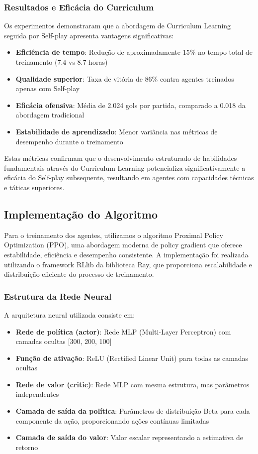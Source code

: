 \subsubsection{Resultados e Eficácia do Curriculum}

Os experimentos demonstraram que a abordagem de Curriculum Learning seguida por Self-play apresenta vantagens significativas:

\begin{itemize}
    \item \textbf{Eficiência de tempo}: Redução de aproximadamente 15\% no tempo total de treinamento (7.4 vs 8.7 horas)
    \item \textbf{Qualidade superior}: Taxa de vitória de 86\% contra agentes treinados apenas com Self-play
    \item \textbf{Eficácia ofensiva}: Média de 2.024 gols por partida, comparado a 0.018 da abordagem tradicional
    \item \textbf{Estabilidade de aprendizado}: Menor variância nas métricas de desempenho durante o treinamento
\end{itemize}

Estas métricas confirmam que o desenvolvimento estruturado de habilidades fundamentais através do Curriculum Learning potencializa significativamente a eficácia do Self-play subsequente, resultando em agentes com capacidades técnicas e táticas superiores.

\subsection{Implementação do Algoritmo}

Para o treinamento dos agentes, utilizamos o algoritmo Proximal Policy Optimization (PPO), uma abordagem moderna de policy gradient que oferece estabilidade, eficiência e desempenho consistente. A implementação foi realizada utilizando o framework RLlib da biblioteca Ray, que proporciona escalabilidade e distribuição eficiente do processo de treinamento.

\subsubsection{Estrutura da Rede Neural}

A arquitetura neural utilizada consiste em:

\begin{itemize}
    \item \textbf{Rede de política (actor)}: Rede MLP (Multi-Layer Perceptron) com camadas ocultas [300, 200, 100]
    \item \textbf{Função de ativação}: ReLU (Rectified Linear Unit) para todas as camadas ocultas
    \item \textbf{Rede de valor (critic)}: Rede MLP com mesma estrutura, mas parâmetros independentes
    \item \textbf{Camada de saída da política}: Parâmetros de distribuição Beta para cada componente da ação, proporcionando ações contínuas limitadas
    \item \textbf{Camada de saída do valor}: Valor escalar representando a estimativa de retorno
\end{itemize}

